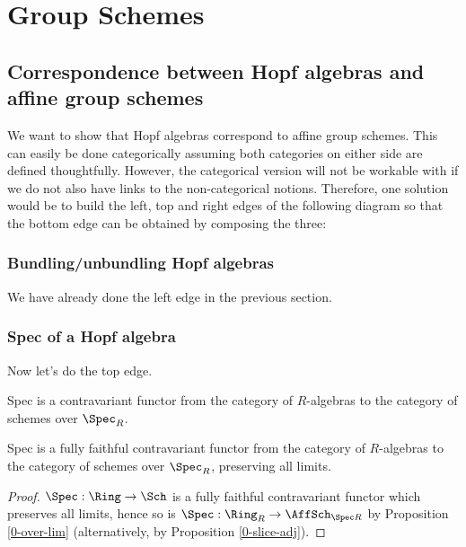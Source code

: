 \section{Group Schemes}


\subsection{Correspondence between Hopf algebras and affine group schemes}


We want to show that Hopf algebras correspond to affine group schemes.
This can easily be done categorically assuming both categories on either side are defined thoughtfully.
However, the categorical version will not be workable with if we do not also have links to the non-categorical notions.
Therefore, one solution would be to build the left, top and right edges of the following
diagram so that the bottom edge can be obtained by composing the three:


\subsubsection{Bundling/unbundling Hopf algebras}


We have already done the left edge in the previous section.


\subsubsection{Spec of a Hopf algebra}


Now let's do the top edge.


\begin{definition}
  \label{0-spec-alg}
  \uses{}
  \leanok

  Spec is a contravariant functor from the category of $R$-algebras to the category of schemes over $\Spec_R$.
\end{definition}


\begin{proposition}
  \label{0-full-faithful-spec-alg}
  \leanok

  Spec is a fully faithful contravariant functor from the category of $R$-algebras to the category of schemes over $\Spec_R$, preserving all limits.
\end{proposition}
\begin{proof}
  \leanok

  $\Spec : \Ring \to \Sch$ is a fully faithful contravariant functor which preserves all limits, hence so is $\Spec : \Ring_R \to \AffSch_{\Spec R}$ by Proposition \ref{0-over-lim} (alternatively, by Proposition \ref{0-slice-adj}).
\end{proof}


